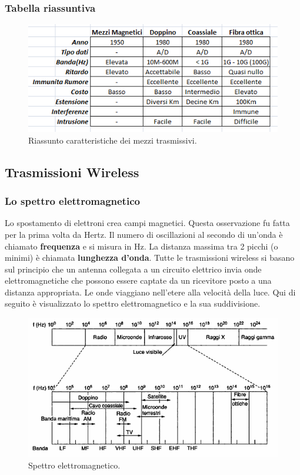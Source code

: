 \subsubsection*{Tabella riassuntiva}

\begin{figure}[htpb]
\centering
\includegraphics[scale=1]{images/mezzi.png}
\caption{Riassunto caratteristiche dei mezzi trasmissivi.}
\end{figure}

\newpage

\subsection{Trasmissioni Wireless}

\subsubsection{Lo spettro elettromagnetico}

Lo spostamento di elettroni crea campi magnetici. Questa osservazione fu fatta per la prima volta da Hertz. Il numero di oscillazioni al secondo di un'onda è chiamato \textbf{frequenza} e si misura in Hz. La distanza massima tra 2 picchi (o minimi) è chiamata \textbf{lunghezza d'onda}.
Tutte le trasmissioni wireless si basano sul principio che un antenna collegata a un circuito elettrico invia onde elettromagnetiche che possono essere captate da un ricevitore posto a una distanza appropriata. Le onde viaggiano nell'etere alla velocità della luce.
Qui di seguito è visualizzato lo spettro elettromagnetico e la sua suddivisione.

\begin{figure}[htpb]
\centering
\includegraphics[scale=1]{images/spettro.png}
\caption{Spettro elettromagnetico.}
\end{figure}

